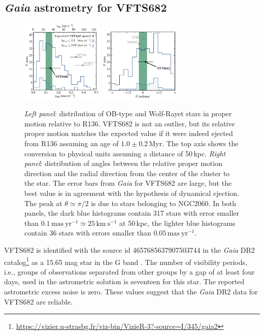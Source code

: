 \documentclass[apjl,twocolumn]{emulateapj}
\begin{document}
\subsection{ \emph{Gaia} astrometry for VFTS682\label{data:gaia}}

\begin{figure}[htbp]
  \centering
  \includegraphics[width=0.35\textwidth]{figures/dist_mu_region.pdf}
  \includegraphics[width=0.35\textwidth]{figures/angle}
  \caption{\emph{Left panel}: distribution of OB-type and Wolf-Rayet stars in proper
    motion relative to R136. VFTS682 is not an outlier, but
    its relative proper motion matches the expected value if it were indeed
    ejected from R136 assuming an age of $1.0\pm0.2$\,Myr. The top axis shows the conversion to physical units
    assuming a distance of 50\,kpc. \emph{Right panel}:  distribution of
    angles between the relative proper motion direction and the radial
    direction from the center of the cluster to the star. The error bars from \emph{Gaia} for VFTS682 are large, but
    the best value is in agreement with the hypothesis of dynamical
    ejection. The peak at $\theta\simeq\pi/2$ is due to stars
    belonging to NGC2060. In both
    panels, the dark blue histograms contain 317 
    stars with error smaller than $0.1\,\mathrm{mas \
      yr^{-1}}\simeq25\,\mathrm{km\ s^{-1}}$ at 50\,kpc, the
    lighter blue histograms contain 36 stars with errors smaller than $0.05\,\mathrm{mas \
      yr^{-1}}$. }
  \label{fig:dist}
\end{figure}

VFTS682 is identified with the source id 4657685637907503744 in the
\emph{Gaia} DR2 catalog\footnote{\url{https://vizier.u-strasbg.fr/viz-bin/VizieR-3?-source=I/345/gaia2}}
  as a 15.65 mag star in the G band
\citep{gaia:16,brown:18}.   The number of visibility periods,
i.e., groups of observations separated from other groups by a gap of at
least four days, used in the astrometric solution is seventeen for this
star. The reported astrometric excess noise is zero.  These values
suggest that the \emph{Gaia} DR2  data for VFTS682 are
reliable.
\end{document}
